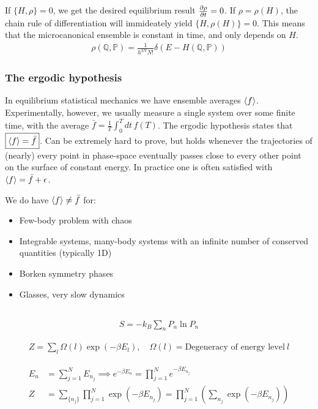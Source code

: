\documentclass[a4paper, english, 12pt]{article}
\newcommand{\eps}{\epsilon}
\newcommand{\closed}[1]{\left( #1 \right)}
\newcommand{\curly}[1]{\{ #1 \} }
\newcommand{\Q}{\mathbb{Q}}
\renewcommand{\P}{\mathbb{P}}
\begin{document}
\begin{multicols*}{2}
If $\curly{H,\rho}=0$, we get the desired equilibrium result $\pdv{\rho}{t}=0$. If $\rho=\rho(H)$, the chain rule of differentiation will immideately yield $\curly{H,\rho(H)}=0$. This means that the microcanonical ensemble is constant in time, and only depends on $H$. 
\begin{align*}
    \rho(\Q,\P) = \frac{1}{h^{3N} N!} \delta\closed{E-H(\Q,\P)}
\end{align*}


\subsubsection*{\scriptsize The ergodic hypothesis}
In equilibrium statistical mechanics we have ensemble averages $\expval{f}$. Experimentally, however, we usually measure a single system over some finite time, with the average $\bar{f}=\frac{1}{T} \int_0^T dt\,f(T)$. The ergodic hypothesis states that $\boxed{\expval{f}=\bar{f}}$. Can be extremely hard to prove, but holds whenever the trajectories of (nearly) every point in phase-space eventually passes close to every other point on the surface of constant energy. In practice one is often satisfied with $\expval{f}=\bar{f}+\eps$. 

We do have $\expval{f}\neq\bar{f}$ for:
\begin{itemize}
    \item Few-body problem with chaos 
    \item Integrable systems, many-body systems with an infinite number of conserved quantities (typically 1D)
    \item Borken symmetry phases
    \item Glasses, very slow dynamics
\end{itemize} 


\subsection*{}

\begin{align*}
    S = -k_B \sum_n P_n \ln P_n
\end{align*}

\begin{align*}
    Z = \sum_l \Omega(l)\exp(-\beta E_l),\quad \Omega(l)=\text{Degeneracy of energy level}\: l
\end{align*}

\begin{align*}
    E_n &= \sum_{j=1}^N E_{n_j} \implies e^{-\beta E_n} = \prod_{j=1}^N e^{-\beta E_{n_j}} \\
    Z &= \sum_{\curly{n_j}} \prod_{j=1}^N \exp(-\beta E_{n_j}) = \prod_{j=1}^N \left( \sum_{n_j} \exp(-\beta E_{n_j}) \right)
\end{align*}


\end{multicols*}
\end{document}
